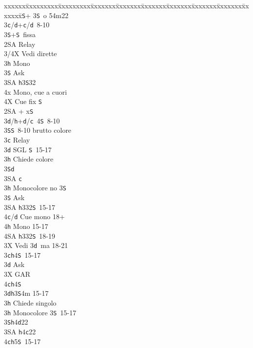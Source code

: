 \documentclass[a4paper,italian]{article}
\newcommand{\BS}{\small{\texttt{S}}}
\newcommand{\BC}{\small{\texttt{c}}}
\newcommand{\BD}{\small{\texttt{d}}}
\newcommand{\BH}{\small{\texttt{h}}}
\newenvironment{bidtable}
{\begin{tabbing}

    xxxxxx\=xxxxxxxxx\=xxxxxxxxx\=xxxxxxx\=xxxxxxx\=xxxxxxx\=xxxxxxx\=xxxxxxx\=xxxxxxx\=xxxxxxx\=\kill}
{\end{tabbing} }%
\begin{document}
\begin{multicols*}{2}
\begin{bidtable}
        2\BS {}+ 3\BS\ o 54m22\+\\
        3\BC/\BD {}+\BC /\BD\ 8-10\\
        3\BS {}+\BS\ fissa\\
        2\small{SA} \> Relay\+\\
        3/4X \> Vedi dirette\\
        3\BH \> Mono\+\\
        3\BS \> Ask\+\\
        3\small{SA} \BH 3\BS 32\\
        4x \> Mono, cue a cuori\-\\
        4X \> Cue fix \BS \-\-\-\\
        2\small{SA} + x\BS \+\\
        3\BD/\BH {}+\BD /\BC\ 4\BS\ 8-10\\
        3\BS {}\BS\ 8-10 brutto colore\\
        3\BC \> Relay\+\\
        3\BD \> SGL \BS\ 15-17\+\\
        3\BH \> Chiede colore\+\\
        3\BS {}\BD \\
        3\small{SA} \BC \-\-\\
        3\BH \> Monocolore no 3\BS \+\\
        3\BS \> Ask\+\\
        3\small{SA} \BH 332\BS\ 15-17\\
        4\BC/\BD \> Cue mono 18+\\
        4\BH \> Mono 15-17\\
        4\small{SA} \BH 332\BS\ 18-19\-\-\\
        3X \> Vedi 3\BD\ ma 18-21\-\-\\
        3\BC {}\BH 4\BS\ 15-17\+\\
        3\BD \> Ask\+\\
        3X \> GAR\\
        4\BC {}\BH 4\BS \-\-\\
        3\BD {}\BH 3\BS 4m 15-17\+\\
        3\BH \> Chiede singolo\-\\
        3\BH \> Monocolore 3\BS\ 15-17\\
        3\BS {}\BH 4\BD 22\\
        3\small{SA} \BH 4\BC 22\\
        4\BC {}\BH 5\BS\ 15-17\-\\
    \end{bidtable}
    \columnbreak


\end{multicols*}
\end{document}
